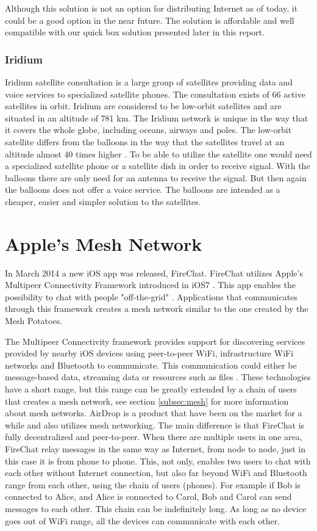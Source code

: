 Although this solution is not an option for distributing Internet as of today, it could be a good option in the near future. The solution is affordable and well compatible with our \gls{quick} box solution presented later in this report. 

\subsubsection{Iridium}
Iridium satellite consultation is a large group of satellites providing data and voice services to specialized satellite phones. The consultation exists of 66 active satellites in orbit. Iridium are considered to be low-orbit satellites and are situated in an altitude of 781 km. The Iridium network is unique in the way that it covers the whole globe, including oceans, airways and poles. The low-orbit satellite differs from the balloons in the way that the satellites travel at an altitude almost 40 times higher \cite{iridium}. To be able to utilize the satellite one would need a specialized satellite phone or a satellite dish in order to receive signal. With the balloons there are only need for an antenna to receive the signal. But then again the balloons does not offer a voice service. The balloons are intended as a cheaper, easier and simpler solution to the satellites.                                         

\section{Apple's Mesh Network}
In March 2014 a new iOS app was released, FireChat. FireChat utilizes Apple's Multipeer Connectivity Framework introduced in iOS7 \cite{appleMesh}. This app enables the possibility to chat with people "off-the-grid" \cite{fireChat}. Applications that communicates through this framework creates a mesh network similar to the one created by the Mesh Potatoes. 

The Multipeer Connectivity framework provides support for discovering services provided by nearby iOS devices using peer-to-peer WiFi, infrastructure WiFi networks and Bluetooth to communicate. This communication could either be message-based data, streaming data or resources such as files \cite{multipeer}. These technologies have a short range, but this range can be greatly extended by a chain of users that creates a mesh network, see section \ref{subsec:mesh} for more information about mesh networks. AirDrop is a product that have been on the market for a while and also utilizes mesh networking. The main difference is that FireChat is fully decentralized and peer-to-peer. When there are multiple users in one area, FireChat relay messages in the same way as Internet, from node to node, just in this case it is from phone to phone.  This, not only, enables two users to chat with each other without Internet connection, but also far beyond WiFi and Bluetooth range from each other, using the chain of users (phones). For example if Bob is connected to Alice, and Alice is connected to Carol, Bob and Carol can send messages to each other. This chain can be indefinitely long. As long as no device goes out of WiFi range, all the devices can communicate with each other. 

